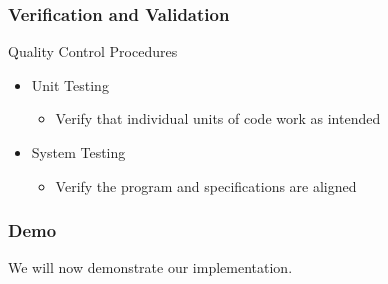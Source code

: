 \documentclass[t,12pt,numbers,fleqn]{beamer}
\begin{document}
\begin{frame}


\frametitle{Verification and Validation}
Quality Control Procedures
\begin{itemize}
    \item Unit Testing
    \begin{itemize}
        \item Verify that individual units of code work as intended
    \end{itemize}
    \item System Testing
    \begin{itemize}
        \item Verify the program and specifications are aligned
    \end{itemize}
\end{itemize}
\end{frame}
\begin{frame}
\frametitle{Demo}
We will now demonstrate our implementation.
\end{frame}
\end{document}
